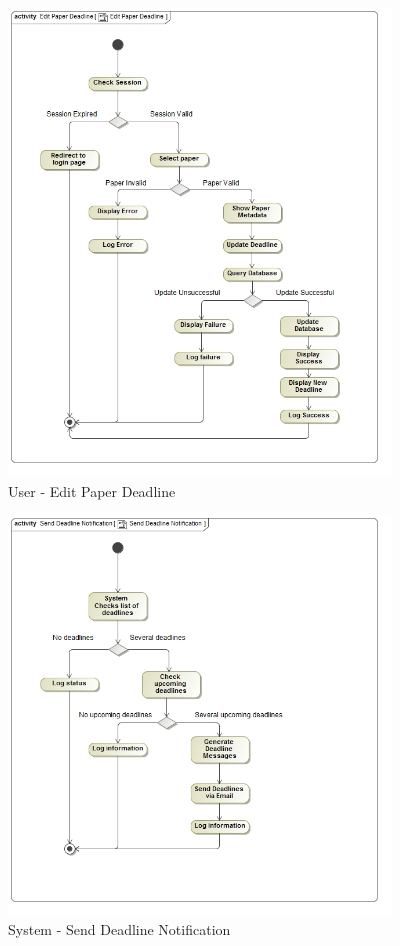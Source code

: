\documentclass{article}
\begin{document}
			\begin{figure}[H]
				\includegraphics[width=4in, center]{../Diagrams/Process Specifications/Edit Paper Deadline.jpg}
				\caption{User - Edit Paper Deadline}
			\end{figure}
			\begin{figure}[H]
				\includegraphics[width=4in, center]{../Diagrams/Process Specifications/Send Deadline Notification.jpg}
				\caption{System - Send Deadline Notification}
			\end{figure}
\end{document}
